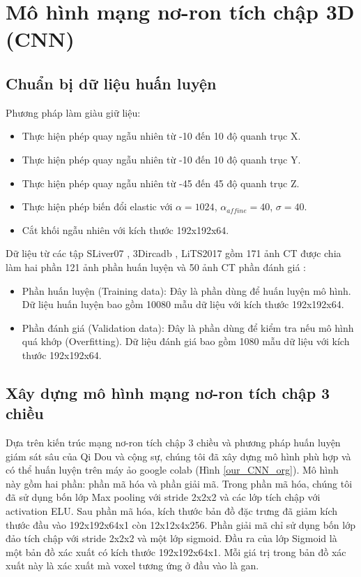 \section{Mô hình mạng nơ-ron tích chập 3D (CNN)}
\subsection{Chuẩn bị dữ liệu huấn luyện}
Phương pháp làm giàu giữ liệu:
\begin{itemize}
\item Thực hiện phép quay ngẫu nhiên từ -10 đến 10 độ quanh trục X.
\item Thực hiện phép quay ngẫu nhiên từ -10 đến 10 độ quanh trục Y.
\item Thực hiện phép quay ngẫu nhiên từ -45 đến 45 độ quanh trục Z.
\item Thực hiện phép biến đổi elastic với $\alpha = 1024$, $\alpha_{affine} = 40$, $\sigma = 40 $.
\item Cắt khối ngẫu nhiên với kích thước 192x192x64.
\end{itemize}
Dữ liệu từ các tập SLiver07 \cite{website:slvier07}, 3Dircadb \cite{website:data_3DIRCADb}, LiTS2017 \cite{website:LiTS} gồm 171 ảnh CT được chia làm hai phần 121 ảnh phần huấn luyện và 50 ảnh CT phần đánh giá :
\begin{itemize}
\item Phần huấn luyện (Training data): Đây là phần dùng để huấn luyện mô hình. Dữ liệu huấn luyện bao gồm 10080 mẫu dữ liệu với kích thước 192x192x64.
\item Phần đánh giá (Validation data): Đây là phần dùng để kiểm tra nếu mô hình quá khớp (Overfitting). Dữ liệu đánh giá bao gồm 1080 mẫu dữ liệu với kích thước 192x192x64.
\end{itemize}
\subsection{Xây dựng mô hình mạng nơ-ron tích chập 3 chiều}
Dựa trên kiến trúc mạng nơ-ron tích chập 3 chiều và phương pháp huấn luyện giám sát sâu\cite{dsn_paper} của Qi Dou và cộng sự, chúng tôi đã xây dựng mô hình phù hợp và có thể huấn luyện trên máy ảo google colab (Hình \ref{our_CNN_org}). Mô hình này gồm hai phần: phần mã hóa và phần giải mã. Trong phần mã hóa, chúng tôi đã sử dụng bốn lớp Max pooling với stride 2x2x2 và các lớp tích chập với activation ELU. Sau phần mã hóa, kích thước bản đồ đặc trưng đã giảm kích thước đầu vào 192x192x64x1 còn 12x12x4x256. Phần giải mã chỉ sử dụng bốn lớp đảo tích chập với stride 2x2x2 và một lớp sigmoid. Đầu ra của lớp Sigmoid là một bản đồ xác xuất có kích thước 192x192x64x1. Mỗi giá trị trong bản đồ xác xuất này là xác xuất mà voxel tương ứng ở đầu vào là gan.\\


